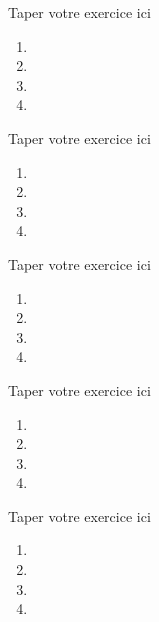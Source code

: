 \documentclass[a4paper,12pt]{report}
\begin{document}
\begin{myexo}
Taper votre exercice ici
\begin{multicols}{2}
\begin{enumerate}
		\item 
		
		\item 
		\item 
		\item

\end{enumerate}
\end{multicols}
\end{myexo}
\begin{myexo}
	Taper votre exercice ici
		\begin{enumerate}
			\item 
			
			\item 
			\item 
			\item
			
		\end{enumerate}

\end{myexo}
\begin{myexo}
	Taper votre exercice ici
	\begin{enumerate}
		\item 
		
		\item 
		\item 
		\item
		
	\end{enumerate}
	
\end{myexo}
\begin{myexo}
	Taper votre exercice ici
	\begin{enumerate}
		\item 
		
		\item 
		\item 
		\item
		
	\end{enumerate}
	
\end{myexo}
\begin{myexo}
	Taper votre exercice ici
	\begin{enumerate}
		\item 
		
		\item 
		\item 
		\item
		
	\end{enumerate}
	
\end{myexo}
\end{document}
